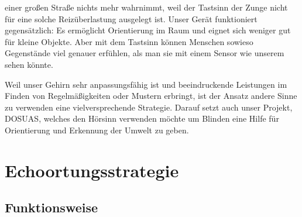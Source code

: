 \documentclass[a4paper,12pt,ngerman]{scrartcl}
\begin{document}
einer großen Straße nichts mehr wahrnimmt, weil der Tastsinn der Zunge
nicht für eine solche Reizüberlastung ausgelegt ist. Unser Gerät funktioniert gegensätzlich: Es ermöglicht 
Orientierung im Raum und eignet sich weniger gut für kleine Objekte. Aber mit dem Tastsinn können Menschen
sowieso Gegenstände viel genauer erfühlen, als man sie mit einem Sensor wie unserem sehen könnte.\par
Weil unser Gehirn sehr anpassungsfähig ist und beeindruckende
Leistungen im Finden von Regelmäßigkeiten oder Mustern erbringt, ist der Ansatz
andere Sinne zu verwenden eine vielversprechende Strategie. Darauf setzt auch 
unser Projekt, DOSUAS, welches den Hörsinn verwenden möchte um Blinden eine Hilfe
für Orientierung und Erkennung der Umwelt zu geben.

\newpage

\section{Echoortungsstrategie}

\subsection{Funktionsweise}
\end{document}
